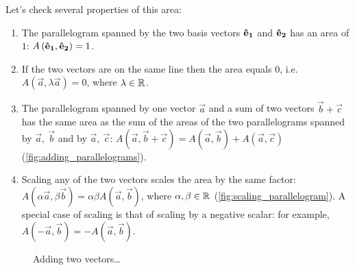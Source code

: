 \documentclass{article}
\begin{document}
Let's check several properties of this area:
\begin{enumerate}
	\item The parallelogram spanned by the two basis vectors $\mathbf{\hat{e}_{1}}$ and $\mathbf{\hat{e}_{2}}$ has an area of $1$: $A\left(\mathbf{\hat{e}_{1}},\mathbf{\hat{e}_{2}}\right)=1$.
	\item If the two vectors are on the same line then the area equals $0$, i.e. $A\left(\vec{a}, \lambda\vec{a}\right)=0$, where $\lambda\in\mathbb{R}^{}$.
	\item The parallelogram spanned by one vector $\vec{a}$ and a sum of two vectors $\vec{b}+\vec{c}$ has the same area as the sum of the areas of the two parallelograms spanned by $\vec{a},\ \vec{b}$ and by $\vec{a},\ \vec{c}$: $A\left(\vec{a},\vec{b}+\vec{c}\right)=A\left(\vec{a},\vec{b}\right)+A\left(\vec{a},\vec{c}\right)$ (\autoref{fig:adding_parallelograms}).
	\item Scaling any of the two vectors scales the area by the same factor: $A\left(\alpha\vec{a},\beta\vec{b}\right)=\alpha\beta A\left(\vec{a},\vec{b}\right)$, where $\alpha,\beta\in\mathbb{R}^{}$ (\autoref{fig:scaling_parallelogram}). A special case of scaling is that of scaling by a negative scalar: for example, $A\left(-\vec{a},\vec{b}\right)=-A\left(\vec{a},\vec{b}\right)$.
\end{enumerate}

\begin{figure}
	\begin{center}
	\end{center}
	\caption{Adding two vectors\ldots}
	\label{fig:adding_parallelograms}
\end{figure}
\end{document}
